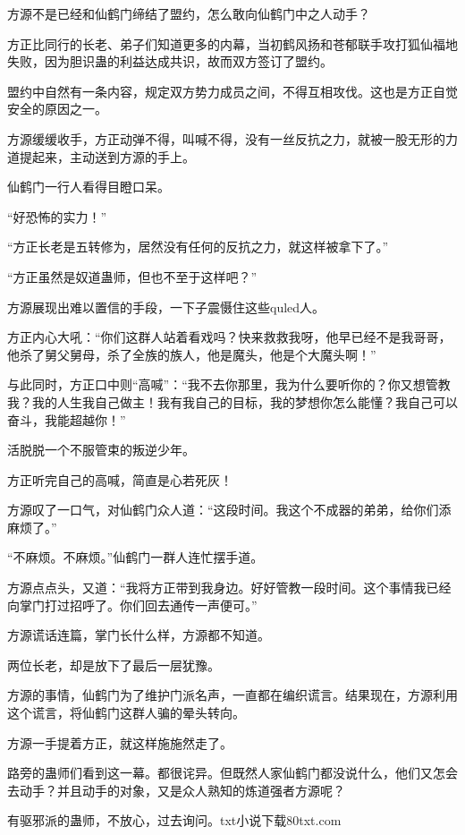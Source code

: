 
\begin{this_body}

方源不是已经和仙鹤门缔结了盟约，怎么敢向仙鹤门中之人动手？

方正比同行的长老、弟子们知道更多的内幕，当初鹤风扬和苍郁联手攻打狐仙福地失败，因为胆识蛊的利益达成共识，故而双方签订了盟约。

盟约中自然有一条内容，规定双方势力成员之间，不得互相攻伐。这也是方正自觉安全的原因之一。

方源缓缓收手，方正动弹不得，叫喊不得，没有一丝反抗之力，就被一股无形的力道提起来，主动送到方源的手上。

仙鹤门一行人看得目瞪口呆。

“好恐怖的实力！”

“方正长老是五转修为，居然没有任何的反抗之力，就这样被拿下了。”

“方正虽然是奴道蛊师，但也不至于这样吧？”

方源展现出难以置信的手段，一下子震慑住这些quled人。

方正内心大吼：“你们这群人站着看戏吗？快来救救我呀，他早已经不是我哥哥，他杀了舅父舅母，杀了全族的族人，他是魔头，他是个大魔头啊！”

与此同时，方正口中则“高喊”：“我不去你那里，我为什么要听你的？你又想管教我？我的人生我自己做主！我有我自己的目标，我的梦想你怎么能懂？我自己可以奋斗，我能超越你！”

活脱脱一个不服管束的叛逆少年。

方正听完自己的高喊，简直是心若死灰！

方源叹了一口气，对仙鹤门众人道：“这段时间。我这个不成器的弟弟，给你们添麻烦了。”

“不麻烦。不麻烦。”仙鹤门一群人连忙摆手道。

方源点点头，又道：“我将方正带到我身边。好好管教一段时间。这个事情我已经向掌门打过招呼了。你们回去通传一声便可。”

方源谎话连篇，掌门长什么样，方源都不知道。

两位长老，却是放下了最后一层犹豫。

方源的事情，仙鹤门为了维护门派名声，一直都在编织谎言。结果现在，方源利用这个谎言，将仙鹤门这群人骗的晕头转向。

方源一手提着方正，就这样施施然走了。

路旁的蛊师们看到这一幕。都很诧异。但既然人家仙鹤门都没说什么，他们又怎会去动手？并且动手的对象，又是众人熟知的炼道强者方源呢？

有驱邪派的蛊师，不放心，过去询问。txt小说下载80txt.com


\end{this_body}
